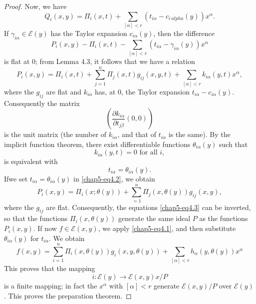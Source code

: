 \begin{proof}
Now, we have
$$
Q_i (x,y) = \Pi_i (x,t) + \sum\limits_{[\alpha] < r} (t_{i \alpha} - c_{i \ alpha} (y) ) x^{\alpha}.
$$
If $\gamma_{i\alpha} \in \mathscr{E} (y)$ has the Taylor expansion $c_{i \alpha} (y)$, then the difference
$$
P_i (x,y) - \Pi_i (x,t) - \sum\limits_{[\alpha] < r} (t_{i\alpha} - \gamma_{i\alpha} (y)) x^{\alpha}
$$
is flat at 0; from Lemma 4.3, it follows that we have a relation
\begin{equation*}
  P_i (x,y) = \Pi_i (x,t) + \sum\limits^{n}_{j=1} \Pi_j (x,t) g_{ij} (x,y,t) + \sum\limits_{[\alpha]<r} k_{i\alpha} (y,t) x^{\alpha} , \tag{4.2}\label{chap5-eq4.2}
\end{equation*}
where the $g_{ij}$ are flat and $k_{i \alpha}$ has, at 0, the Taylor expansion $t_{i\alpha} - c_{i\alpha } (y)$. Consequently the matrix
$$
\left(\frac{\partial k_{i\alpha}}{\partial t_{j \beta}} (0, 0) \right)
$$
is the unit matrix (the number of $k_{i\alpha}$, and that of $t_{i\alpha}$ is the same). By the implicit function theorem, there exist differentiable functions $\theta_{i\alpha} (y)$ such that
$$
k_{i \alpha} (y, t) = 0 \text{ for all } i ,
$$
is equivalent with
$$
t_{i \alpha } = \theta_{i \alpha} (y).
$$
If\pageoriginale we set $t_{i \alpha} = \theta_{i \alpha} (y)$ in \eqref{chap5-eq4.2}, we obtain
\begin{equation*}
  P_i (x,y) = \Pi_i (x; \theta (y)) + \sum\limits^{n}_{=1} \Pi_j (x, \theta(y)) g_{ij} (x,y), \tag{4.3}\label{chap5-eq4.3}
\end{equation*}
where the $g_{ij}$ are flat. Consequently, the equations \eqref{chap5-eq4.3} can be inverted, so that the functions $\Pi_i(x, \theta(y))$ generate the same ideal $P$ as the functions $P_i (x,y)$. If now $f\in \mathscr{E}(x,y)$, we apply \eqref{chap5-eq4.1}, and then substitute $\theta_{i\alpha}(y)$ for $t_{i\alpha}$. We obtain
$$
f(x,y) = \sum\limits^{n}_{i=1} \Pi_i (x, \theta (y)) g_i (x,y, \theta(y)) + \sum\limits_{[\alpha] < r} h_\alpha (y, \theta (y)) x^\alpha
$$
This proves that the mapping
$$
i : \mathscr{E} (y) \to \mathscr{E} (x,y)x / P
$$
is a finite mapping; in fact the $x^{\alpha}$ with $[\alpha] < r$ generate $\mathscr{E} (x,y)/P$ over $\mathscr{E}(y)$. This proves the preparation theorem.
\end{proof}

